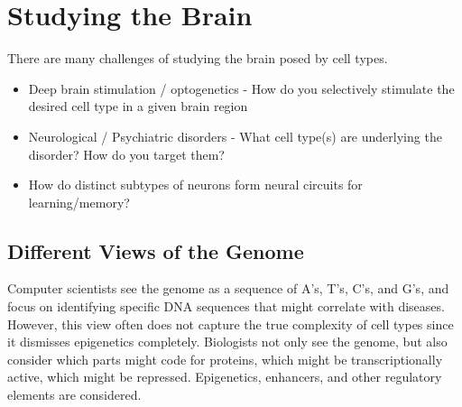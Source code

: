 \documentclass[10pt]{article}
\begin{document}
\section*{Studying the Brain}
There are many challenges of studying the brain posed by cell types.
\begin{itemize}
	\item Deep brain stimulation / optogenetics - How do you selectively stimulate the desired cell type in a given brain region
	\item Neurological / Psychiatric disorders - What cell type(s) are underlying the disorder?  How do you target them?
	\item How do distinct subtypes of neurons form neural circuits for learning/memory?
\end{itemize}

\subsection*{Different Views of the Genome}
Computer scientists see the genome as a sequence of A's, T's, C's, and G's, and focus on identifying specific DNA sequences that might correlate with diseases. However, this view often does not capture the true complexity of cell types since it dismisses epigenetics completely.  Biologists not only see the genome, but also consider which parts might code for proteins, which might be transcriptionally active, which might be repressed.  Epigenetics, enhancers, and other regulatory elements are considered.
\end{document}
